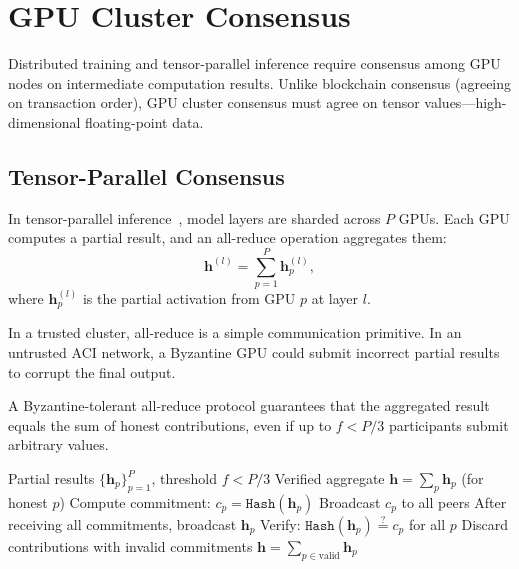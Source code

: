 \section{GPU Cluster Consensus}

\label{sec:cluster}

Distributed training and tensor-parallel inference require consensus among GPU
nodes on intermediate computation results. Unlike blockchain consensus (agreeing
on transaction order), GPU cluster consensus must agree on tensor values---high-dimensional floating-point data.

\subsection{Tensor-Parallel Consensus}

In tensor-parallel inference~\cite{megatron}, model layers are sharded across
$P$ GPUs. Each GPU computes a partial result, and an all-reduce operation
aggregates them:
\begin{equation}
\mathbf{h}^{(l)} = \sum_{p=1}^{P} \mathbf{h}_p^{(l)},
\end{equation}
where $\mathbf{h}_p^{(l)}$ is the partial activation from GPU $p$ at layer $l$.

In a trusted cluster, all-reduce is a simple communication primitive. In an
untrusted ACI network, a Byzantine GPU could submit incorrect partial results
to corrupt the final output.

\begin{definition}
A Byzantine-tolerant all-reduce protocol guarantees that the aggregated result
equals the sum of honest contributions, even if up to $f < P/3$ participants
submit arbitrary values.
\end{definition}

\begin{algorithm}
\caption{Byzantine All-Reduce with Commitment}
\label{alg:allreduce}
\begin{algorithmic}[1]
\Require Partial results $\{\mathbf{h}_p\}_{p=1}^{P}$, threshold $f < P/3$
\Ensure Verified aggregate $\mathbf{h} = \sum_p \mathbf{h}_p$ (for honest $p$)
    \State Compute commitment: $c_p = \texttt{Hash}(\mathbf{h}_p)$
    \State Broadcast $c_p$ to all peers
\EndFor
{}
    \State After receiving all commitments, broadcast $\mathbf{h}_p$
    \State Verify: $\texttt{Hash}(\mathbf{h}_p) \stackrel{?}{=} c_p$ for all $p$
    \State Discard contributions with invalid commitments
\EndFor
\State $\mathbf{h} = \sum_{p \in \text{valid}} \mathbf{h}_p$
\end{algorithmic}
\end{algorithm}

